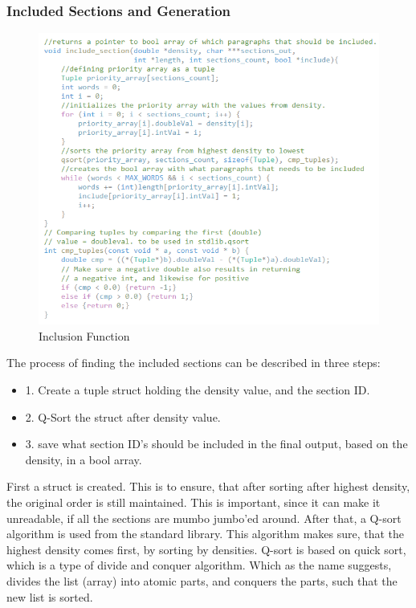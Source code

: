 \subsubsection{Included Sections and Generation}
\begin{figure}[H]
  \centering
  \includegraphics[scale = 1]{figures/includefunction_v2.png}
  \caption{Inclusion Function}\label{fig:includefunction_v2}
\end{figure}
The process of finding the included sections can be described in three steps:
\begin{itemize}
  \item 1. Create a tuple struct holding the density value, and the section ID.
  \item 2. Q-Sort the struct after density value.
  \item 3. save what section ID's should be included in the final output, based on the density, in a bool array.
\end{itemize}
First a struct is created. This is to ensure, that after sorting after highest density, the original order is still maintained.
This is important, since it can make it unreadable, if all the sections are mumbo jumbo'ed around.
After that, a Q-sort algorithm is used from the standard library. This algorithm makes sure, that the highest density comes first, by sorting by densities.
Q-sort is based on quick sort, which is a type of divide and conquer algorithm. Which as the name suggests, divides the list (array) into atomic parts, and conquers the parts, such that the new list is sorted.
